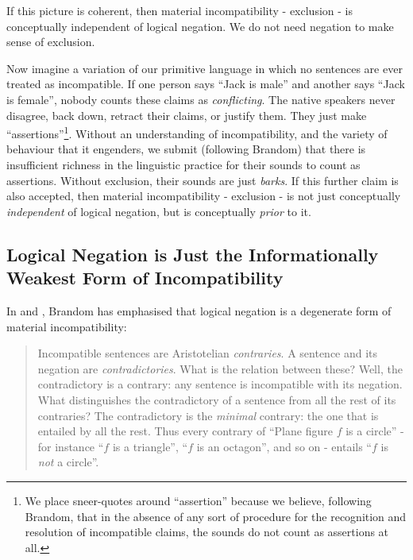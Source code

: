 If this picture is coherent, then material incompatibility - exclusion - is conceptually independent of logical negation.
We do not need negation to make sense of exclusion.

Now imagine a variation of our primitive language in which no sentences are ever treated as incompatible.
If one person says ``Jack is male'' and another says ``Jack is female'', nobody counts these claims as \emph{conflicting}. 
The native speakers never disagree, back down, retract their claims, or justify them. They just make ``assertions''\footnote{We place sneer-quotes around ``assertion'' because we believe, following Brandom, that in the absence of any sort of procedure for the recognition and resolution of incompatible claims, the sounds do not count as assertions at all.}.
Without an understanding of incompatibility, and the variety of behaviour that it engenders, we submit (following Brandom) that there is insufficient richness in the linguistic practice for their sounds to count as assertions.
Without exclusion, their sounds are just \emph{barks}.
If this further claim is also accepted, then material incompatibility - exclusion - is not just conceptually \emph{independent} of logical negation, but is conceptually \emph{prior} to it.

\subsection{Logical Negation is Just the Informationally Weakest Form of Incompatibility}

In \cite{brandom2} and \cite{brandom}, Brandom has emphasised that logical negation is a degenerate form of material incompatibility:
\begin{quote}
Incompatible sentences are Aristotelian \emph{contraries}. A sentence and its negation are \emph{contradictories}. What is the relation between these? Well, the contradictory is a contrary: any sentence is incompatible with its negation. What distinguishes the contradictory of a sentence  from all the rest of its contraries? The contradictory is the \emph{minimal} contrary: the one that is entailed by all the rest. Thus every contrary of ``Plane figure $f$ is a circle'' - for instance ``$f$ is a triangle'', ``$f$ is an octagon'', and so on - entails ``$f$ is \emph{not} a circle''.
\end{quote}

